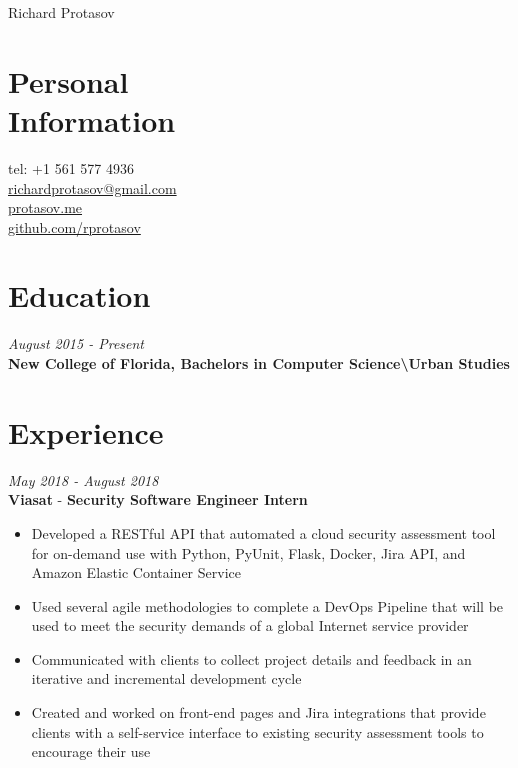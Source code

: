 \documentclass[margin,line,a4paper]{resume}
\begin{document}
{\sc \Huge Richard Protasov}
\begin{resume}
    \vspace{0cm}

    \section{\mysidestyle Personal\\Information}
    tel: +1 561 577 4936 \\
    \href{mailto:richardprotasov@gmail.com}{richardprotasov@gmail.com} \\
    \href{https://protasov.me}{protasov.me}\\
    \href{https://github.com/rprotasov}{github.com/rprotasov}
    
    \section{\mysidestyle Education}
        \textit{August 2015 - Present}\\
        \textbf{New College of Florida, Bachelors in Computer Science\textbackslash Urban Studies}
        
    \section{\mysidestyle Experience}
        \textit{May 2018 - August 2018}\\
        \textbf{Viasat} - \textbf{Security Software Engineer Intern}
        \begin{itemize}
            \item Developed a RESTful API that automated a cloud security assessment tool for on-demand use with Python, PyUnit, Flask, Docker, Jira API, and Amazon Elastic Container Service
            \item Used several agile methodologies to complete a DevOps Pipeline that will be used to meet the security demands of a global Internet service provider
            \item Communicated with clients to collect project details and feedback in an iterative and incremental development cycle
            \item Created and worked on front-end pages and Jira integrations that provide clients with a self-service interface to existing security assessment tools to encourage their use
        \end{itemize}


\end{resume}
\end{document}
